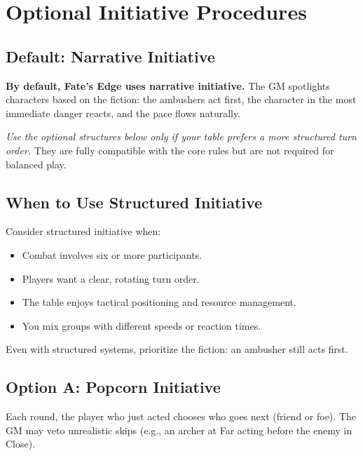 \section{Optional Initiative Procedures}
\label{sec:optional-initiative}

\subsection{Default: Narrative Initiative}
\label{subsec:narrative-initiative-default}
\textbf{By default, Fate’s Edge uses narrative initiative.} The GM spotlights characters based on the fiction: the ambushers act first, the character in the most immediate danger reacts, and the pace flows naturally.

\emph{Use the optional structures below only if your table prefers a more structured turn order.} They are fully compatible with the core rules but are not required for balanced play.

\subsection{When to Use Structured Initiative}
Consider structured initiative when:
\begin{itemize}
\item Combat involves six or more participants.
\item Players want a clear, rotating turn order.
\item The table enjoys tactical positioning and resource management.
\item You mix groups with different speeds or reaction times.
\end{itemize}
Even with structured systems, prioritize the fiction: an ambusher still acts first.

\subsection{Option A: Popcorn Initiative}
\label{subsec:popcorn-initiative}
Each round, the player who just acted chooses who goes next (friend or foe). The GM may veto unrealistic skips (e.g., an archer at Far acting before the enemy in Close).

